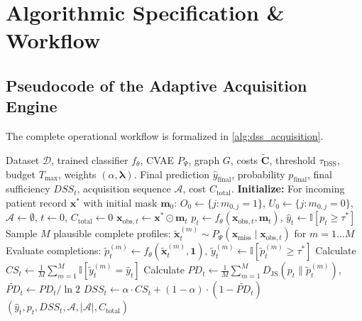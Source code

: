 \documentclass[11pt,a4paper]{report}
\begin{document}
\chapter{Algorithmic Specification \& Workflow}

\section{Pseudocode of the Adaptive Acquisition Engine}
The complete operational workflow is formalized in \cref{alg:dss_acquisition}.

\begin{algorithm}[htbp]
\caption{Decision-Sufficiency-Guided Adaptive Clinical Acquisition}
\label{alg:dss_acquisition}
\begin{algorithmic}[1]
\Require Dataset $\mathcal{D}$, trained classifier $f_\theta$, CVAE $P_\Psi$, graph $G$, costs $\widetilde{\mathbf{C}}$, threshold $\tau_{\text{DSS}}$, budget $T_{\max}$, weights $(\alpha, \boldsymbol{\lambda})$.
\Ensure Final prediction $\hat{y}_{\text{final}}$, probability $p_{\text{final}}$, final sufficiency $DSS_t$, acquisition sequence $\mathcal{A}$, cost $C_{\text{total}}$.
\State \textbf{Initialize:} For incoming patient record $\mathbf{x}^*$ with initial mask $\mathbf{m}_0$:
\State $O_0 \gets \{j : m_{0,j} = 1\}$, $U_0 \gets \{j : m_{0,j} = 0\}$, $\mathcal{A} \gets \emptyset$, $t \gets 0$, $C_{\text{total}} \gets 0$
  \State $\mathbf{x}_{\text{obs},t} \gets \mathbf{x}^* \odot \mathbf{m}_t$
  \State $p_t \gets f_\theta(\mathbf{x}_{\text{obs},t}, \mathbf{m}_t)$, \quad $\hat{y}_t \gets \mathbb{I}[p_t \ge \tau^*]$
  \State Sample $M$ plausible complete profiles: $\tilde{\mathbf{x}}_t^{(m)} \sim P_\Psi(\mathbf{x}_{\text{miss}} \mid \mathbf{x}_{\text{obs},t})$ for $m=1 \dots M$
  \State Evaluate completions: $\tilde{p}_t^{(m)} \gets f_\theta(\tilde{\mathbf{x}}_t^{(m)}, \mathbf{1})$, \quad $\tilde{y}_t^{(m)} \gets \mathbb{I}[\tilde{p}_t^{(m)} \ge \tau^*]$
  \State Calculate $CS_t \gets \frac{1}{M}\sum_{m=1}^M \mathbb{I}[\tilde{y}_t^{(m)} = \hat{y}_t]$
  \State Calculate $PD_t \gets \frac{1}{M}\sum_{m=1}^M D_{\text{JS}}(p_t \parallel \tilde{p}_t^{(m)})$, \quad $\widetilde{PD}_t \gets PD_t / \ln 2$
  \State $DSS_t \gets \alpha \cdot CS_t + (1 - \alpha) \cdot (1 - \widetilde{PD}_t)$
    \State \Return $(\hat{y}_t, p_t, DSS_t, \mathcal{A}, |\mathcal{A}|, C_{\text{total}})$ 

\end{algorithmic}
\end{algorithm}
\end{document}
